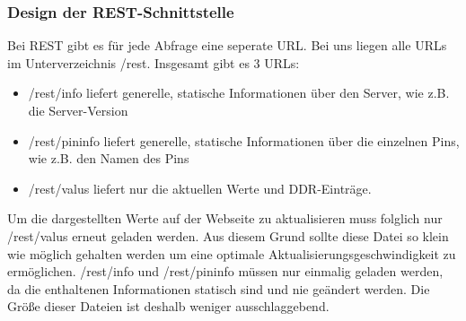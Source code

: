 \subsubsection{Design der REST-Schnittstelle}
Bei REST gibt es für jede Abfrage eine seperate URL. Bei uns liegen alle URLs im
Unterverzeichnis \textrm{/rest}. Insgesamt gibt es 3 URLs:
\begin{itemize}
  \item  \textrm{/rest/info} liefert generelle, statische Informationen über den
  Server, wie z.B. die Server-Version
  \item  \textrm{/rest/pininfo} liefert generelle, statische Informationen über
  die einzelnen Pins, wie z.B. den Namen des Pins
  \item  \textrm{/rest/valus} liefert nur die aktuellen Werte und DDR-Einträge.
\end{itemize}

Um die dargestellten Werte auf der Webseite zu aktualisieren muss folglich nur
\textrm{/rest/valus} erneut geladen werden. Aus diesem Grund sollte diese
Datei so klein wie möglich gehalten werden um eine optimale
Aktualisierungsgeschwindigkeit zu ermöglichen. \textrm{/rest/info} und  
\textrm{/rest/pininfo} müssen nur einmalig geladen werden, da die enthaltenen
Informationen statisch sind und nie geändert werden. Die Größe dieser Dateien
ist deshalb weniger ausschlaggebend.
